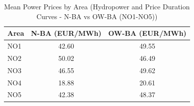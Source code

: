 \begin{table}[htbp]
\centering
\caption{Mean Power Prices by Area (Hydropower and Price Duration Curves - N-BA vs OW-BA (NO1-NO5))}
\label{tab:mean_prices_NO_areas_N_BA_OW_BA}
\begin{tabular}{lcc}
\hline
Area & N-BA (EUR/MWh) & OW-BA (EUR/MWh) \\
\hline
NO1 & 42.60 & 49.55 \\
NO2 & 50.02 & 46.49 \\
NO3 & 46.55 & 49.62 \\
NO4 & 18.88 & 20.61 \\
NO5 & 42.38 & 48.37 \\
\hline
\end{tabular}
\end{table}
